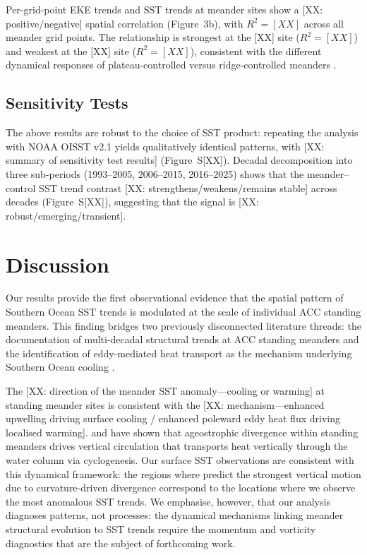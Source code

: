\documentclass[draft]{agujournal2019}
\begin{document}
Per-grid-point EKE trends and SST trends at meander sites show a [XX: positive/negative] spatial correlation (Figure~3b), with $R^{2} = [XX]$ across all meander grid points.
The relationship is strongest at the [XX] site ($R^{2} = [XX]$) and weakest at the [XX] site ($R^{2} = [XX]$), consistent with the different dynamical responses of plateau-controlled versus ridge-controlled meanders \cite{liu2026standing}.


\subsection{Sensitivity Tests}

The above results are robust to the choice of SST product: repeating the analysis with NOAA OISST v2.1 yields qualitatively identical patterns, with [XX: summary of sensitivity test results] (Figure~S[XX]).
Decadal decomposition into three sub-periods (1993--2005, 2006--2015, 2016--2025) shows that the meander--control SST trend contrast [XX: strengthens/weakens/remains stable] across decades (Figure~S[XX]), suggesting that the signal is [XX: robust/emerging/transient].





\section{Discussion}

Our results provide the first observational evidence that the spatial pattern of Southern Ocean SST trends is modulated at the scale of individual ACC standing meanders.
This finding bridges two previously disconnected literature threads: the documentation of multi-decadal structural trends at ACC standing meanders \cite{liu2024characteristics, liu2026standing} and the identification of eddy-mediated heat transport as the mechanism underlying Southern Ocean cooling \cite{morrison2016mechanisms, kang2026km}.


The [XX: direction of the meander SST anomaly---cooling or warming] at standing meander sites is consistent with the [XX: mechanism---enhanced upwelling driving surface cooling / enhanced poleward eddy heat flux driving localised warming].
 and  have shown that ageostrophic divergence within standing meanders drives vertical circulation that transports heat vertically through the water column via cyclogenesis.
Our surface SST observations are consistent with this dynamical framework: the regions where  predict the strongest vertical motion due to curvature-driven divergence correspond to the locations where we observe the most anomalous SST trends.
We emphasise, however, that our analysis diagnoses patterns, not processes: the dynamical mechanisms linking meander structural evolution to SST trends require the momentum and vorticity diagnostics that are the subject of forthcoming work.
\end{document}
